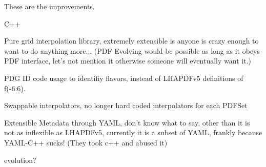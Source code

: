 These are the improvements.

C++

Pure grid interpolation library, extremely extensible is anyone is
crazy enough to want to do anything more... (PDF Evolving would be
possible as long as it obeys PDF interface, let's not mention it
otherwise someone will eventually want it.)

PDG ID code usage to identifiy flavors, instead of LHAPDFv5
definitions of f(-6:6).

Swappable interpolators, no longer hard coded interpolators for each
PDFSet

Extensible Metadata through YAML, don't know what to say, other than it
is not as inflexible as LHAPDFv5, currently it is a subset of YAML,
frankly because YAML-C++ sucks! (They took c++ and abused it)

\alphaS evolution? 
